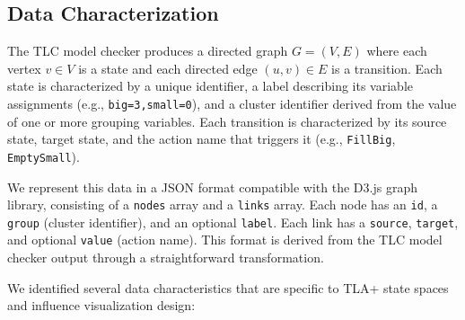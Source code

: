 \documentclass[conference]{IEEEtran}
\begin{document}
\subsection{Data Characterization}
\label{sec:data}

The TLC model checker produces a directed graph $G = (V, E)$ where each vertex $v \in V$ is a state and each directed edge $(u, v) \in E$ is a transition. Each state is characterized by a unique identifier, a label describing its variable assignments (e.g., \texttt{big=3,small=0}), and a cluster identifier derived from the value of one or more grouping variables. Each transition is characterized by its source state, target state, and the action name that triggers it (e.g., \texttt{FillBig}, \texttt{EmptySmall}).

We represent this data in a JSON format compatible with the D3.js graph library, consisting of a \texttt{nodes} array and a \texttt{links} array. Each node has an \texttt{id}, a \texttt{group} (cluster identifier), and an optional \texttt{label}. Each link has a \texttt{source}, \texttt{target}, and optional \texttt{value} (action name). This format is derived from the TLC model checker output through a straightforward transformation.

We identified several data characteristics that are specific to TLA+ state spaces and influence visualization design:
\end{document}
